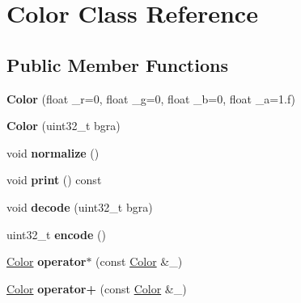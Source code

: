 \hypertarget{class_color}{}\section{Color Class Reference}
\label{class_color}
\subsection*{Public Member Functions}
\begin{DoxyCompactItemize}
\item 
\hypertarget{class_color_af2e51da9c123ee50b651378d218be42f}{}{\bfseries Color} (float \+\_\+r=0, float \+\_\+g=0, float \+\_\+b=0, float \+\_\+a=1.f)\label{class_color_af2e51da9c123ee50b651378d218be42f}

\item 
\hypertarget{class_color_ac4ff2769e12f12760ccaf7da5c99c50a}{}{\bfseries Color} (uint32\+\_\+t bgra)\label{class_color_ac4ff2769e12f12760ccaf7da5c99c50a}

\item 
\hypertarget{class_color_a8392c40b06e19002e1afcb4a8bf218a9}{}void {\bfseries normalize} ()\label{class_color_a8392c40b06e19002e1afcb4a8bf218a9}

\item 
\hypertarget{class_color_a78c0ffd6704bada13f339a407f7c7b7f}{}void {\bfseries print} () const \label{class_color_a78c0ffd6704bada13f339a407f7c7b7f}

\item 
\hypertarget{class_color_a4a7670524b1b1944532958d615ab538a}{}void {\bfseries decode} (uint32\+\_\+t bgra)\label{class_color_a4a7670524b1b1944532958d615ab538a}

\item 
\hypertarget{class_color_a6b5429cc36be0bfb96a26d569a461339}{}uint32\+\_\+t {\bfseries encode} ()\label{class_color_a6b5429cc36be0bfb96a26d569a461339}

\item 
\hypertarget{class_color_a71b854b39452e4dc250164739be2c510}{}\hyperlink{class_color}{Color} {\bfseries operator$\ast$} (const \hyperlink{class_color}{Color} \&\+\_\+)\label{class_color_a71b854b39452e4dc250164739be2c510}

\item 
\hypertarget{class_color_a9fed66b2ca39d6936248bef7cb60da65}{}\hyperlink{class_color}{Color} {\bfseries operator+} (const \hyperlink{class_color}{Color} \&\+\_\+)\label{class_color_a9fed66b2ca39d6936248bef7cb60da65}


\end{DoxyCompactItemize}

